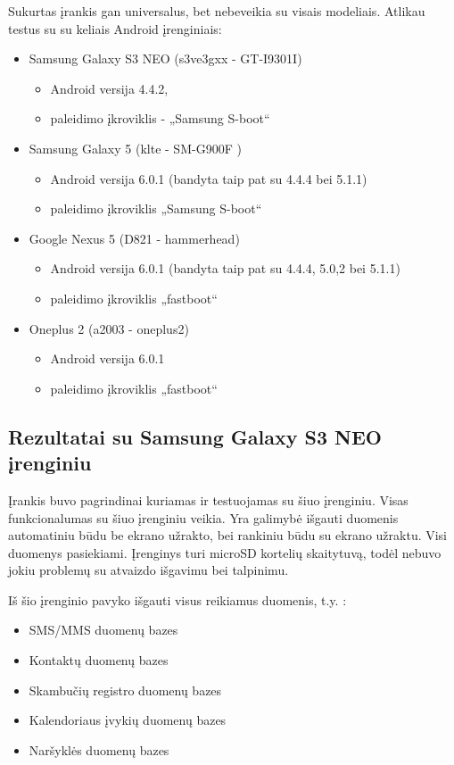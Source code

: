 \documentclass[a4paper,12pt,fleqn]{article}
\begin{document}
Sukurtas įrankis gan universalus, bet nebeveikia su visais modeliais. Atlikau testus su su keliais Android įrenginiais:
\begin{itemize}
    \item Samsung Galaxy S3 NEO (s3ve3gxx - GT-I9301I) 
    \begin{itemize}
        \item Android versija 4.4.2,
        \item paleidimo įkroviklis - „Samsung S-boot“
    \end{itemize}
    \item Samsung Galaxy 5 (klte - SM-G900F )
    \begin{itemize}
        \item Android versija 6.0.1 (bandyta taip pat su 4.4.4 bei 5.1.1)
        \item paleidimo įkroviklis  „Samsung S-boot“
    \end{itemize}
    \item Google Nexus 5 (D821 - hammerhead)
    \begin{itemize}
        \item  Android versija 6.0.1 (bandyta taip pat su 4.4.4, 5.0,2 bei 5.1.1)
        \item paleidimo įkroviklis „fastboot“
    \end{itemize}
    \item Oneplus 2 (a2003 - oneplus2)
    \begin{itemize}
        \item  Android versija 6.0.1
        \item  paleidimo įkroviklis „fastboot“
    \end{itemize}
\end{itemize}

\subsection{Rezultatai su Samsung Galaxy S3 NEO įrenginiu}
Įrankis buvo pagrindinai kuriamas ir testuojamas su šiuo įrenginiu. Visas funkcionalumas su šiuo įrenginiu veikia. Yra galimybė išgauti duomenis automatiniu būdu be ekrano užrakto, bei rankiniu būdu su ekrano užraktu. Visi duomenys pasiekiami. Įrenginys turi microSD kortelių skaitytuvą, todėl nebuvo jokiu problemų su atvaizdo išgavimu bei talpinimu. 

Iš šio įrenginio pavyko išgauti visus reikiamus duomenis, t.y. : 
\begin{itemize}
 \setlength{\itemsep}{1pt}
  \setlength{\parskip}{0pt}
  \setlength{\parsep}{0pt}
    \item  SMS/MMS duomenų bazes
    \item  Kontaktų duomenų bazes
    \item  Skambučių registro duomenų bazes
    \item  Kalendoriaus įvykių duomenų bazes
    \item  Naršyklės duomenų bazes
\end{itemize}
\end{document}
